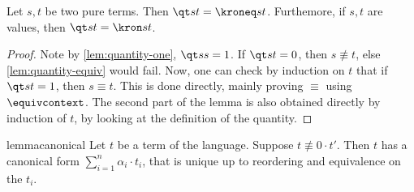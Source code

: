 \begin{lemma}\label{lem:quantity-pure}
  Let $s, t$ be two pure terms.
  Then $\qt s t = \kroneq s t$.
  Furthemore, if $s, t$ are values, then $\qt s t = \kron s t$.
\end{lemma}

\begin{proof}
  Note by \autoref{lem:quantity-one}, $\qt s s = 1$.
  If $\qt s t = 0$, then $s \not\equiv t$, else
  \autoref{lem:quantity-equiv} would fail.
  Now, one can check by induction on $t$ that if $\qt s t = 1$, then
  $s \equiv t$.
  This is done directly, mainly proving $\equiv$ using $\equivcontext$.
  The second part of the lemma is also obtained directly by induction
  of $t$, by looking at the definition of the quantity. \qedhere
\end{proof}

\begin{restatable}{lemma}{canonical}
  \label{lem:canonical}
  Let $t$ be a term of the language. Suppose $t \not\equiv 0 \cdot t'$.
  Then $t$ has a canonical form $\sum_{i=1}^n \alpha_i \cdot t_i$,
  that is unique up to reordering and equivalence on the $t_i$.
\end{restatable}

